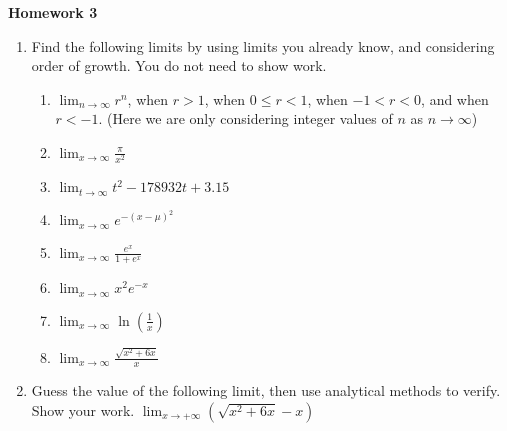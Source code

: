 \documentclass{article}
\begin{document}
\begin{center}
    \large \textbf{Homework 3}
\end{center}

                \begin{enumerate}

    	\item Find the following limits by using limits you already know, and considering order of growth. You do not need to show work.
    	    \begin{enumerate}
    	        \item $ \lim_{n \rightarrow \infty} r^n$, when $r > 1$, when $0\leq r<1$, when $-1 < r < 0$, and when $r < -1$. (Here we are only considering integer values of $n$ as $n\to \infty$)
    	        \item $ \lim_{x\rightarrow \infty} \frac{\pi}{x^2}$
    	        \item $ \lim_{t\rightarrow \infty} t^2-178932t+3.15$
    	        \item $ \lim_{x\rightarrow \infty} e^{-(x-\mu)^2}$
    	        \item $ \lim_{x\rightarrow \infty} \frac{e^x}{1+e^x}$
    	        \item $ \lim_{x\rightarrow \infty} x^2e^{-x}$
    	        \item $ \lim_{x\rightarrow \infty} \ln \left(\frac{1}{x}\right)$ 
    	        \item $ \lim_{x\rightarrow \infty} \frac{\sqrt{x^2+6x}}{x}$
    	    \end{enumerate}
    	     \item Guess the value of the following limit, then use analytical methods to verify. Show your work. $ \lim_{x \rightarrow +\infty} (\sqrt{x^2+6x}-x)$ 
        	




\end{enumerate}
\end{document}
